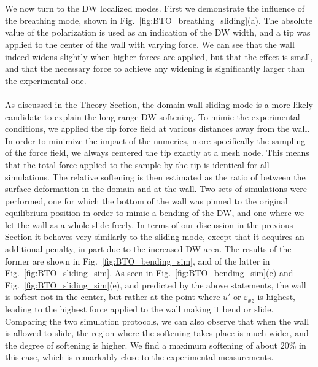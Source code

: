 \\\\
We now turn to the DW localized modes.
First we demonstrate the influence of the breathing mode, shown in Fig.~\ref{fig:BTO_breathing_sliding}(a).
The absolute value of the polarization is used as an indication of the DW width, and a tip was applied to the center of the wall with varying force.
We can see that the wall indeed widens slightly when higher forces are applied, but that the effect is small, and that the necessary force to achieve any widening is significantly larger than the experimental one.
\\\\
As discussed in the Theory Section, the domain wall sliding mode is a more likely candidate to explain the long range DW softening.
To mimic the experimental conditions, we applied the tip force field at various distances away from the wall.
In order to minimize the impact of the numerics, more specifically the sampling of the force field, we always centered the tip exactly at a mesh node.
This means that the total force applied to the sample by the tip is identical for all simulations.
The relative softening is then estimated as the ratio of between the surface deformation in the domain and at the wall.
Two sets of simulations were performed, one for which the bottom of the wall was pinned to the original equilibrium position in order to mimic a bending of the DW, and one where we let the wall as a whole slide freely.
In terms of our discussion in the previous Section it behaves very similarly to the sliding mode, except that it acquires an additional penalty, in part due to the increased DW area.
The results of the former are shown in Fig.~\ref{fig:BTO_bending_sim}, and of the latter in Fig.~\ref{fig:BTO_sliding_sim}.
As seen in Fig.~\ref{fig:BTO_bending_sim}(e) and Fig.~\ref{fig:BTO_sliding_sim}(e), and predicted by the above statements, the wall is softest not in the center, but rather at the point where $u'$ or $\varepsilon_{xz}$ is highest, leading to the highest force applied to the wall making it bend or slide.
Comparing the two simulation protocols, we can also observe that when the wall is allowed to slide, the region where the softening takes place is much wider, and the degree of softening is higher.
We find a maximum softening of about 20\% in this case, which is remarkably close to the experimental measurements.
